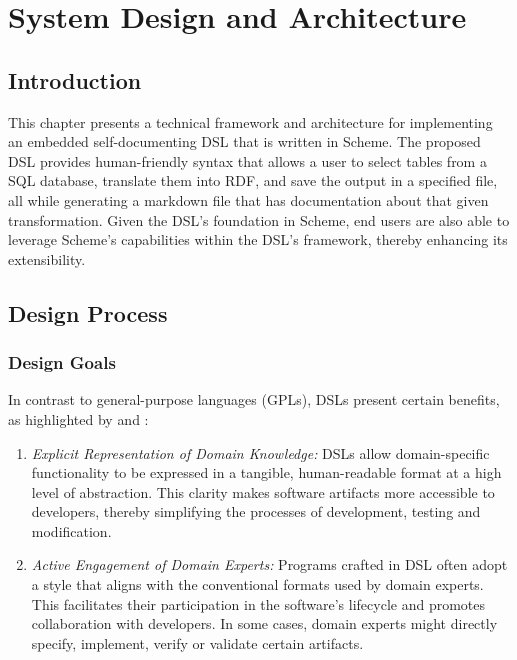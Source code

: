 \chapter{System Design and Architecture}

\section{Introduction}

This chapter presents a technical framework and architecture for implementing an embedded self-documenting DSL that is written in Scheme.  The proposed DSL provides human-friendly syntax that allows a user to select tables from a SQL database, translate them into RDF, and save the output in a specified file, all while generating a markdown file that has documentation about that given transformation.  Given the DSL's foundation in Scheme, end users are also able to leverage Scheme's capabilities within the DSL's framework, thereby enhancing its extensibility.

\section{Design Process}

\subsection{Design Goals}

In contrast to general-purpose languages (GPLs), DSLs present certain benefits, as highlighted by \citet{freudenthal2010domain} and \citet{spinellis2001notable}:

\begin{enumerate}
\item \textit{Explicit Representation of Domain Knowledge:} DSLs allow domain-specific functionality to be expressed in a tangible, human-readable format at a high level of abstraction.  This clarity makes software artifacts more accessible to developers, thereby simplifying the processes of development, testing and modification.
\item \textit{Active Engagement of Domain Experts:} Programs crafted in DSL often adopt a style that aligns with the conventional formats used by domain experts.  This facilitates their participation in the software's lifecycle and promotes collaboration with developers. In some cases, domain experts might directly specify, implement, verify or validate certain artifacts.
\end{enumerate}


